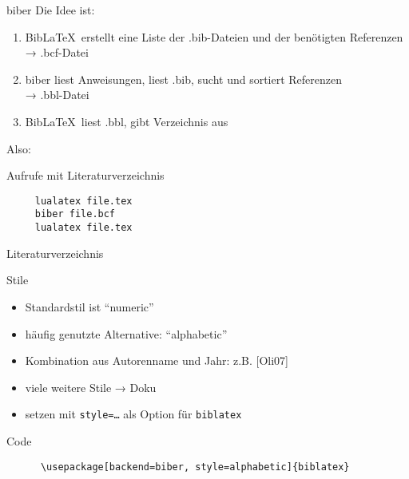 \begin{frame}[fragile]{biber}
  Die Idee ist:
  \begin{enumerate}
    \item Bib\LaTeX\ erstellt eine Liste der .bib-Dateien und der benötigten Referenzen\\
          → .bcf-Datei
    \item biber liest Anweisungen, liest .bib, sucht und sortiert Referenzen\\
          → .bbl-Datei
    \item Bib\LaTeX\ liest .bbl, gibt Verzeichnis aus
  \end{enumerate}

  \vspace{10pt}
  Also:
  \begin{block}{Aufrufe mit Literaturverzeichnis}
    \begin{lstlisting}
     lualatex file.tex
     biber file.bcf
     lualatex file.tex
    \end{lstlisting}
  \end{block}
\end{frame}

\begin{frame}{Literaturverzeichnis}
  \nocite{*}
  \printbibliography[heading=none]
\end{frame}
\begin{frame}[fragile]{Stile}
  \begin{itemize}
    \item Standardstil ist \enquote{numeric}
    \item häufig genutzte Alternative: \enquote{alphabetic}
    \item Kombination aus Autorenname und Jahr: z.B. [Oli07]
    \item viele weitere Stile → Doku
    \item setzen mit \texttt{style=…} als Option für \texttt{biblatex}
  \end{itemize}
  \begin{block}{Code}
    \begin{lstlisting}
      \usepackage[backend=biber, style=alphabetic]{biblatex}
    \end{lstlisting}
  \end{block}
\end{frame}
